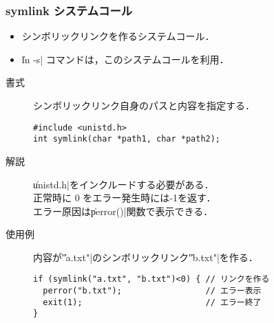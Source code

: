 \documentclass{beamer}                 %
\begin{document}
\begin{frame}[fragile]
  \frametitle{symlink システムコール}
  \begin{itemize}
  \item シンボリックリンクを作るシステムコール．
  \item \|ln -s| コマンドは，このシステムコールを利用．
  \end{itemize}

  \begin{description}
  \item[書式] シンボリックリンク自身のパスと内容を指定する．
\begin{verbatim}
#include <unistd.h>
int symlink(char *path1, char *path2);
\end{verbatim}

  \item[解説] \|unistd.h|をインクルードする必要がある．\\
    正常時に 0 をエラー発生時には-1を返す．\\
    エラー原因は\|perror()|関数で表示できる．

  \item[使用例] 内容が\|"a.txt"|のシンボリックリンク\|"b.txt"|を作る．
\begin{verbatim}
if (symlink("a.txt", "b.txt")<0) { // リンクを作る
  perror("b.txt");                 // エラー表示
  exit(1);                         // エラー終了
}
\end{verbatim}
\end{description}
\end{frame}
\end{document}
